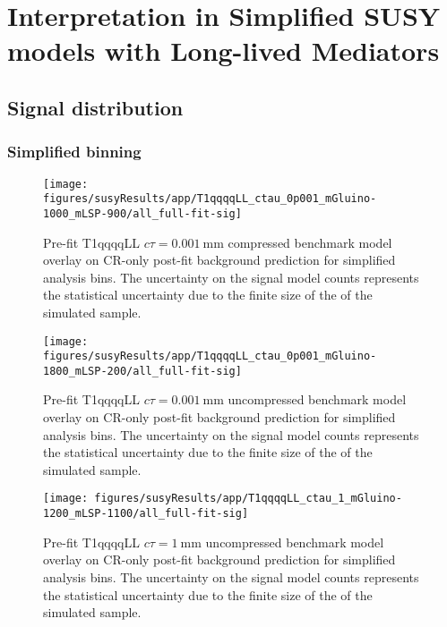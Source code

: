 \section{Interpretation in Simplified SUSY models with Long-lived Mediators}
\label{app:LLP}

\subsection{Signal distribution}
\label{app:susyll-mr-plots}

\subsubsection{Simplified binning}

\begin{figure}[h!]
    \begin{center}
        \texttt{[image: figures/susyResults/app/T1qqqqLL\_ctau\_0p001\_mGluino-1000\_mLSP-900/all\_full-fit-sig]}
        \caption{
            Pre-fit T1qqqqLL $c\tau=0.001~\mathrm{mm}$ compressed benchmark
            model overlay on CR-only post-fit background prediction for
            simplified analysis bins. The uncertainty on the signal model counts
            represents the statistical uncertainty due to the finite size of the
            of the simulated sample.
        }
        \label{fig:T1qqqqLL_ctau_0p001_compressed_MR_simp}
    \end{center}
\end{figure}

\begin{figure}[h!]
    \begin{center}
        \texttt{[image: figures/susyResults/app/T1qqqqLL\_ctau\_0p001\_mGluino-1800\_mLSP-200/all\_full-fit-sig]}
        \caption{
            Pre-fit T1qqqqLL $c\tau=0.001~\mathrm{mm}$ uncompressed benchmark
            model overlay on CR-only post-fit background prediction for
            simplified analysis bins. The uncertainty on the signal model counts
            represents the statistical uncertainty due to the finite size of the
            of the simulated sample.
        }
        \label{fig:T1qqqqLL_ctau_0p001_uncompressed_MR_simp}
    \end{center}
\end{figure}

\begin{figure}[h!]
    \begin{center}
        \texttt{[image: figures/susyResults/app/T1qqqqLL\_ctau\_1\_mGluino-1200\_mLSP-1100/all\_full-fit-sig]}
        \caption{
            Pre-fit T1qqqqLL $c\tau=1~\mathrm{mm}$ uncompressed benchmark
            model overlay on CR-only post-fit background prediction for
            simplified analysis bins. The uncertainty on the signal model counts
            represents the statistical uncertainty due to the finite size of the
            of the simulated sample.
        }
        \label{fig:T1qqqqLL_ctau_1_uncompressed_MR_simp}
    \end{center}
\end{figure}

